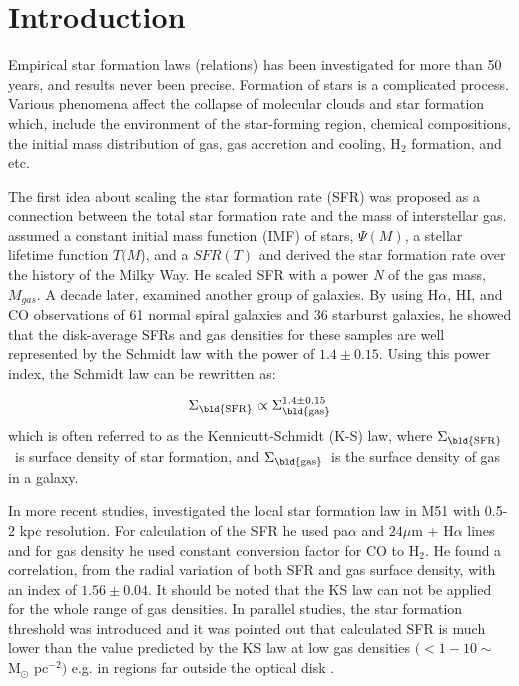 \documentclass[useAMS,usenatbib]{mn2e}
\newcommand \sigmagas    {$\Sigma_{\rm \bld {gas }}$\ }
\newcommand \eqsigmagas    {\Sigma_{\rm \bld {gas }}}
\newcommand \sigmasfr     {$\Sigma_{\rm \bld {SFR }}$\ }
\newcommand \eqsigmasfr     {\Sigma_{\rm \bld {SFR }}}
\begin{document}
\section{Introduction}
\label{sec:intro} %

Empirical star formation laws (relations) has been investigated for more than 50 years, and results never been precise. Formation of stars is a complicated process. Various phenomena affect the collapse of molecular clouds and star formation which, include the environment of the star-forming region, chemical compositions, the initial mass distribution of gas, gas accretion and cooling, H$_2$ formation, and etc.

The first idea about scaling the star formation rate (SFR) was proposed as a connection between the total star formation rate and the mass of interstellar gas. \cite{Schmidt59} assumed a constant initial mass function (IMF) of stars, $\Psi (M)$, a stellar lifetime function {$T(M$)}, and a  {$SFR(T)$} and derived the star formation rate over the history of the Milky Way. He scaled SFR with a power {\it N} of the gas mass, $M_{gas}$. %
A decade later, \cite{Kennicutt98a} examined another group of galaxies. By using H$\alpha$, HI, and CO observations of 61 normal spiral galaxies and 36 starburst galaxies, he showed that the disk-average SFRs and gas densities for these samples are well represented by the Schmidt law with the power of $1.4 \pm 0.15$. Using this power index, the Schmidt law can be rewritten as:

\begin{equation}
\label{equ:ks_org}
\eqsigmasfr \propto \eqsigmagas^{1.4\pm0.15}
\end{equation}
which is often referred to as the Kennicutt-Schmidt (K-S) law, where \sigmasfr is surface density of star formation, and \sigmagas is the surface density of gas in a galaxy.


In more recent studies, \cite{Kennicutt08} investigated the local star formation law in M51 with 0.5-2 kpc resolution. For calculation of the SFR he used pa${\alpha}$ and $24\mu$m + H${\alpha}$ lines and for gas density he used constant conversion factor for CO to H$_2$. He found a correlation, from the radial variation of both SFR and gas surface density, with an index of $1.56 \pm 0.04$.
It should be noted that the KS law can not be applied for the whole range of gas densities. In parallel studies, the star formation threshold was introduced and it was pointed out that calculated SFR is much lower than the value predicted by the KS law at low gas densities $( < 1-10\sim$ M$_{\odot}$ pc$^{-2})$ e.g. in regions far outside the optical disk \citep[e.g.,][]{Martin01, Bigiel08}.
\end{document}
